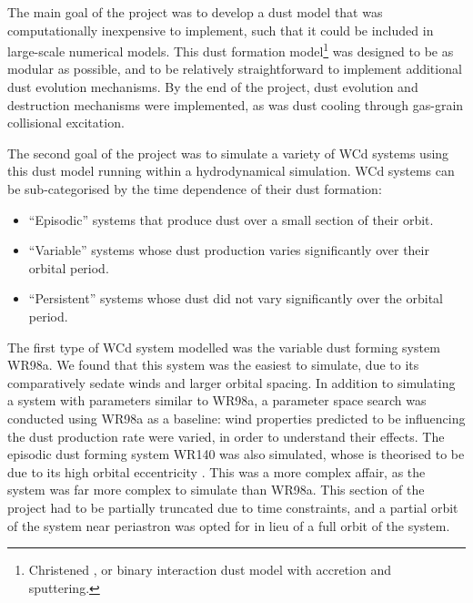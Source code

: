 The main goal of the project was to develop a dust model that was computationally inexpensive to implement, such that it could be included in large-scale numerical models.
This dust formation model\footnote{Christened \bidmas{}, or binary interaction dust model with accretion and sputtering.} was designed to be as modular as possible, and to be relatively straightforward to implement additional dust evolution mechanisms.
By the end of the project, dust evolution and destruction mechanisms were implemented, as was dust cooling through gas-grain collisional excitation.

The second goal of the project was to simulate a variety of WCd systems using this dust model running within a hydrodynamical simulation.
WCd systems can be sub-categorised by the time dependence of their dust formation:

\begin{itemize}
  \item ``Episodic'' systems that produce dust over a small section of their orbit. 
  \item ``Variable'' systems whose dust production varies significantly over their orbital period.
  \item ``Persistent'' systems whose dust did not vary significantly over the orbital period.
\end{itemize}

\noindent
The first type of WCd system modelled was the variable dust forming system WR98a.
We found that this system was the easiest to simulate, due to its comparatively sedate winds and larger orbital spacing. 
In addition to simulating a system with parameters similar to WR98a, a parameter space search was conducted using WR98a as a baseline: wind properties predicted to be influencing the dust production rate were varied, in order to understand their effects.
The episodic dust forming system WR140 was also simulated, whose  is theorised to be due to its high orbital eccentricity .
This was a more complex affair, as the system was far more complex to simulate than WR98a.
This section of the project had to be partially truncated due to time constraints, and a partial orbit of the system near periastron was opted for in lieu of a full orbit of the system.

